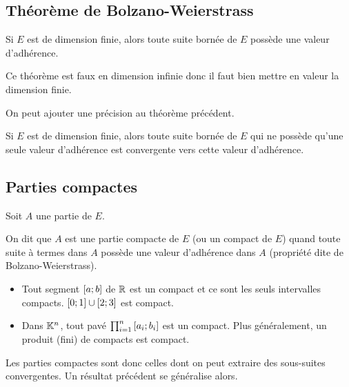 \subsection{Théorème de Bolzano-Weierstrass}

\begin{theo}
Si \(E\) est de dimension finie, alors toute suite bornée de \(E\) possède une valeur d'adhérence.
\end{theo}

\begin{rem}
Ce théorème est faux en dimension infinie donc il faut bien mettre en valeur la dimension finie.
\end{rem}

On peut ajouter une précision au théorème précédent.

\begin{prop}
Si \(E\) est de dimension finie, alors toute suite bornée de \(E\) qui ne possède qu'une seule valeur d'adhérence est convergente vers cette valeur d'adhérence.
\end{prop}

\subsection{Parties compactes}

\begin{defi}
Soit \(A\) une partie de \(E\).

On dit que \(A\) est une partie compacte de \(E\) (ou un compact de \(E\)) quand toute suite à termes dans \(A\) possède une valeur d'adhérence dans \(A\) (propriété dite de Bolzano-Weierstrass).
\end{defi}

\begin{ex}
\begin{itemize}
    \item Tout segment \(\left[a;b\right]\) de \(\mathbb{R}\) est un compact et ce sont les seuls intervalles compacts. \(\left[0;1\right]\cup\left[2;3\right]\) est compact. \\
    \item Dans \(\mathbb{K}^n\), tout pavé \(\prod_{i=1}^n\left[a_i;b_i\right]\) est un compact. Plus généralement, un produit (fini) de compacts est compact.
\end{itemize}
\end{ex}

Les parties compactes sont donc celles dont on peut extraire des sous-suites convergentes. Un résultat précédent se généralise alors.

